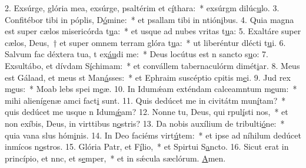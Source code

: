 2. Exsúrge, glória mea, exsúrge, psaltérim et c\uline{í}thara:~* exsúrgm dilúc\uline{u}lo.
3. Confitébor tibi in póplis, D\uline{ó}mine:~* et psallam tibi in ntión\uline{i}bus.
4. Quia magna est super cælos misericórda t\uline{u}a:~* et usque ad nubes vritas t\uline{u}a:
5. Exaltáre super cælos, Deus,~† et super omnem terram glóra t\uline{u}a:~* ut liberéntur dlécti t\uline{u}i.
6. Salvum fac déxtera tua, t ex\uline{áu}di me:~* Deus locútus est n sancto s\uline{u}o:
7. Exsultábo, et dívdam S\uline{í}chimam:~* et convállem tabernaculórm dimét\uline{i}ar.
8. Meus est Gálaad, et meus st Man\uline{á}sses:~* et Ephraim suscéptio cpitis m\uline{e}i.
9. Jud rex m\uline{e}us:~* Moab lebs spei m\uline{e}æ.
10. In Idumǽam exténdam calceamntum m\uline{e}um:~* mihi alienígenæ amci fact\uline{i} sunt.
11. Quis dedúcet me in civitátm mun\uline{í}tam?~* quis dedúcet me usque n Idum\uline{ǽ}am?
12. Nonne tu, Deus, qui rpul\uline{í}sti nos,~* et non exíbis, Deus, in virttibus n\uline{o}stris?
13. Da nobis auxílium de tribulti\uline{ó}ne:~* quia vana slus hóm\uline{i}nis.
14. In Deo faciéms virt\uline{ú}tem:~* et ipse ad níhilum dedúcet inmícos n\uline{o}stros.
15. Glória Patr, et F\uline{í}lio,~* et Spirtui S\uline{a}ncto.
16. Sicut erat in princípio, et nnc, et s\uline{e}mper,~* et in sǽcula sæclórum. \uline{A}men.

